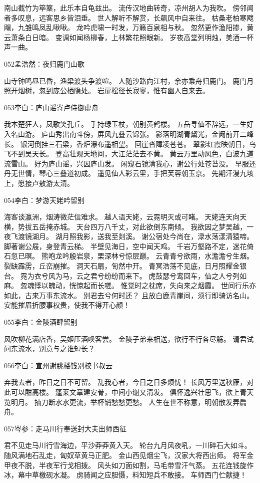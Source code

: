 南山截竹为筚篥，此乐本自龟兹出。
流传汉地曲转奇，凉州胡人为我吹。
傍邻闻者多叹息，远客思乡皆泪垂。
世人解听不解赏，长飙风中自来往。
枯桑老柏寒飕飗，九雏鸣凤乱啾啾。
龙吟虎啸一时发，万籁百泉相与秋。
忽然更作渔阳掺，黄云萧条白日暗。
变调如闻杨柳春，上林繁花照眼新。
岁夜高堂列明烛，美酒一杯声一曲。

052孟浩然：夜归鹿门山歌

山寺钟鸣昼已昏，渔梁渡头争渡喧。
人随沙路向江村，余亦乘舟归鹿门。
鹿门月照开烟树，忽到庞公栖隐处。
岩扉松径长寂寥，惟有幽人自来去。

053李白：庐山谣寄卢侍御虚舟

我本楚狂人，凤歌笑孔丘。
手持绿玉杖，朝别黄鹤楼。
五岳寻仙不辞远，一生好入名山游。
庐山秀出南斗傍，屏风九叠云锦张。
影落明湖青黛光，金阙前开二峰长。
银河倒挂三石梁，香炉瀑布遥相望。
回崖沓障凌苍苍。
翠影红霞映朝日，鸟飞不到吴天长。
登高壮观天地间，大江茫茫去不黄。
黄云万里动风色，白波九道流雪山。
好为庐山谣，兴因庐山发。
闲窥石镜清我心，谢公行处苍苔没。
早服还丹无世情，琴心三叠道初成。
遥见仙人彩云里，手把芙蓉朝玉京。
先期汗漫九垓上，愿接卢敖游太清。

054李白：梦游天姥吟留别

海客谈瀛洲，烟涛微茫信难求。
越人语天姥，云霓明灭或可睹。
天姥连天向天横，势拔五岳掩赤城。
天台四万八千丈，对此欲倒东南倾。
我欲因之梦吴越，一夜飞渡镜湖月。
湖月照我影，送我至剡溪。
谢公宿处今尚在，渌水荡漾清猿啼。
脚著谢公屐，身登青云梯。
半壁见海日，空中闻天鸡。
千岩万壑路不定，迷花倚石忽已暝。
熊咆龙吟殷岩泉，栗深林兮惊层巅。
云青青兮欲雨，水澹澹兮生烟。
裂缺霹雳，丘峦崩摧。
洞天石扇，訇然中开。
青冥浩荡不见底，日月照耀金银台。
霓为衣兮风为马，云之君兮纷纷而来下。
虎鼓瑟兮鸾回车，仙之人兮列如麻。
忽魂悸以魄动，恍惊起而长嗟。
惟觉时之枕席，失向来之烟霞。
世间行乐亦如此，古来万事东流水。
别君去兮何时还？
且放白鹿青崖间，须行即骑访名山。
安能摧眉折腰事权贵，使我不得开心颜！

055李白：金陵酒肆留别

风吹柳花满店香，吴姬压酒唤客尝。
金陵子弟来相送，欲行不行各尽觞。
请君试问东流水，别意与之谁短长？

056李白：宣州谢朓楼饯别校书叔云

弃我去者，昨日之日不可留。
乱我心者，今日之日多烦忧！
长风万里送秋雁，对此可以酣高楼。
蓬莱文章建安骨，中间小谢又清发。
俱怀逸兴壮思飞，欲上青天览明月。
抽刀断水水更流，举杯销愁愁更愁。
人生在世不称意，明朝散发弄扁舟。

057岑参：走马川行奉送封大夫出师西征

君不见走马川行雪海边，平沙莽莽黄入天。
轮台九月风夜吼，一川碎石大如斗。
随风满地石乱走，匈奴草黄马正肥。
金山西见烟尘飞，汉家大将西出师。
将军金甲夜不脱，半夜军行戈相拨。
风头如刀面如割，马毛带雪汗气蒸。
五花连钱旋作冰，幕中草檄砚水凝。
虏骑闻之应胆慑，料知短兵不敢接。
车师西门伫献捷！

